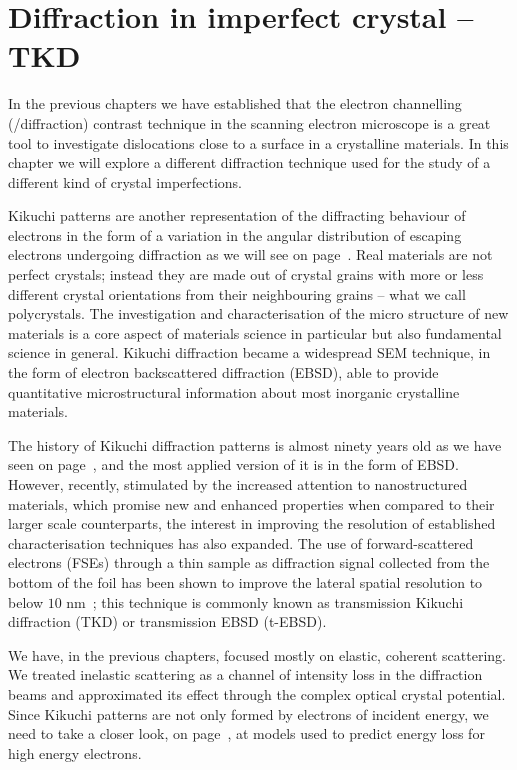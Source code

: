\chapter{Diffraction in imperfect crystal -- TKD}
\label{chap:TKD}
In the previous chapters we have established that the electron channelling (/diffraction) contrast  technique in the scanning electron microscope is a great tool to investigate dislocations close to a surface in a crystalline materials. In this chapter we will explore a different diffraction technique used for the study of a different kind of crystal imperfections. 

Kikuchi patterns are another representation of the diffracting behaviour of electrons in the form of a variation in the angular distribution of escaping electrons undergoing diffraction as we will see on page~\pageref{sec:Kikuchi}. Real materials are not perfect crystals; instead they are made out of crystal grains with more or less different crystal orientations from their neighbouring grains -- what we call polycrystals. The investigation and characterisation of the micro structure of new materials is a core aspect of materials science in particular but also fundamental science in general. Kikuchi diffraction became a widespread SEM technique, in the form of electron backscattered diffraction (EBSD), able to provide quantitative microstructural information about most inorganic crystalline materials. 



The history of Kikuchi diffraction patterns is almost ninety years old as we have seen on page~\pageref{table:historyDiff}, and the most applied version of it is in the form of EBSD.
However, recently, stimulated by the increased attention to nanostructured materials, which promise new and enhanced properties when compared to their larger scale counterparts, the interest in improving the resolution of established characterisation techniques has also expanded. The use of forward-scattered electrons (FSEs) through a thin sample as diffraction signal collected from the bottom of the foil has been shown to improve the lateral spatial resolution to below $10$ nm~\cite{keller2011, trimby2012}; this technique is commonly known as transmission Kikuchi diffraction (TKD) or transmission EBSD (t-EBSD). 

We have, in the previous chapters, focused mostly on elastic, coherent scattering. We treated inelastic scattering as a channel of intensity loss in the diffraction beams and approximated its effect through the complex optical crystal potential. Since Kikuchi patterns are not only formed by electrons of incident energy, we need to take a closer look, on page~\pageref{sec:scatter}, at models used to predict energy loss for high energy electrons.


